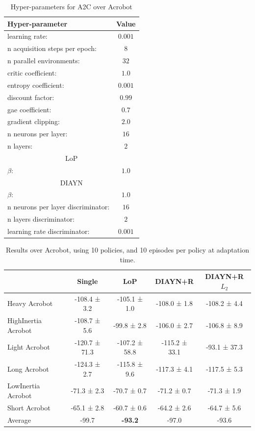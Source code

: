 \begin{table}[h!]
\begin{center}
\begin{tabular}{l|c} \toprule
   \textbf{Hyper-parameter} & \textbf{Value} \\ \hline
    learning rate: &  $0.001$\\
    n acquisition steps per epoch: & $8$ \\
    n parallel environments: &  $32$\\
    critic coefficient: &  $1.0$\\
    entropy coefficient: &  $0.001$\\
    discount factor: &  $0.99$\\
    gae coefficient: &  $0.7$\\
    gradient clipping: & $2.0$ \\ 
    n neurons per layer: & $16$ \\
    n layers: & $2$ \\ \toprule
    \multicolumn{2}{c}{LoP} \\  \hline
    $\beta$: & $1.0$ \\
    \toprule
    \multicolumn{2}{c}{DIAYN} \\ \hline
    $\beta$: & $1.0$ \\
    n neurons per layer discriminator: & $16$ \\
    n layers discriminator: & $2$ \\
    learning rate discriminator: & $0.001$ \\ \hline
\end{tabular}
\end{center}
\caption{Hyper-parameters for A2C over Acrobot}
\label{table:hp_acrobot}
\end{table}


\begin{table}[h!]
\begin{center}
    \begin{tabular}{l|c|c|c|c} \toprule
    &	Single	& LoP &	DIAYN+R& 	DIAYN+R $L_2$	\\ \hline
Heavy Acrobot	&	-108.4 ± 3.2	& -105.1 ± 1.0	& -108.0 ± 1.8	& -108.2 ± 4.4	\\
HighInertia Acrobot	&	-108.7 ± 5.6	& -99.8 ± 2.8	& -106.0 ± 2.7	& -106.8 ± 8.9	\\
Light Acrobot	&	-120.7 ± 71.3	& -107.2 ± 58.8	& -115.2 ± 33.1	& -93.1 ± 37.3	\\
Long Acrobot	&	-124.3 ± 2.7	& -115.8 ± 9.6	& -117.3 ± 4.1	& -117.5 ± 5.3	\\
LowInertia Acrobot	&	-71.3 ± 2.3	& -70.7 ± 0.7	& -71.2 ± 0.7	& -71.3 ± 1.9	\\
Short Acrobot	&	-65.1 ± 2.8	& -60.7 ± 0.6	& -64.2 ± 2.6	& -64.7 ± 5.6	\\ \hline
Average	&	-99.7&	\textbf{-93.2} &	-97.0&	-93.6\\
\hline
\end{tabular}
\caption{Results over Acrobot, using 10 policies, and 10 episodes per policy at adaptation time. }
\end{center}
\end{table}
\newpage
